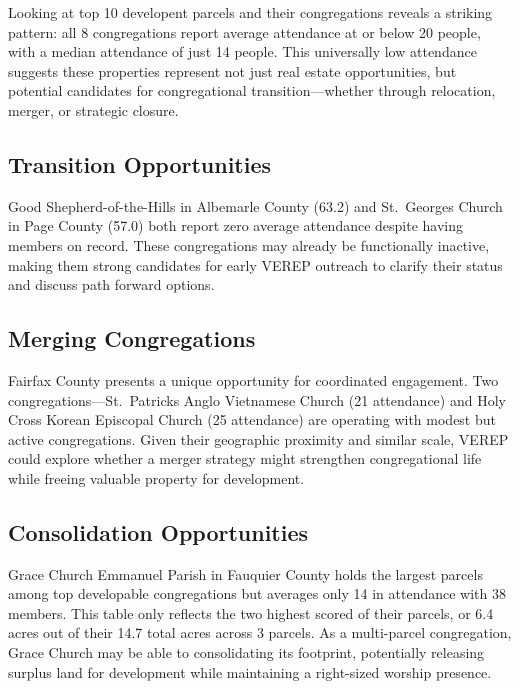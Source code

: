 \documentclass[
  letterpaper,
  DIV=11,
  numbers=noendperiod,
  oneside]{scrreprt}
\begin{document}
Looking at top 10 developent parcels and their congregations reveals a
striking pattern: all 8 congregations report average attendance at or
below 20 people, with a median attendance of just 14 people. This
universally low attendance suggests these properties represent not just
real estate opportunities, but potential candidates for congregational
transition---whether through relocation, merger, or strategic closure.

\subsection{Transition Opportunities}\label{transition-opportunities}

Good Shepherd-of-the-Hills in Albemarle County (63.2) and St.~Georges
Church in Page County (57.0) both report zero average attendance despite
having members on record. These congregations may already be
functionally inactive, making them strong candidates for early VEREP
outreach to clarify their status and discuss path forward options.

\subsection{Merging Congregations}\label{merging-congregations}

Fairfax County presents a unique opportunity for coordinated engagement.
Two congregations---St.~Patricks Anglo Vietnamese Church (21 attendance)
and Holy Cross Korean Episcopal Church (25 attendance) are operating
with modest but active congregations. Given their geographic proximity
and similar scale, VEREP could explore whether a merger strategy might
strengthen congregational life while freeing valuable property for
development.

\subsection{Consolidation
Opportunities}\label{consolidation-opportunities}

Grace Church Emmanuel Parish in Fauquier County holds the largest
parcels among top developable congregations but averages only 14 in
attendance with 38 members. This table only reflects the two highest
scored of their parcels, or 6.4 acres out of their 14.7 total acres
across 3 parcels. As a multi-parcel congregation, Grace Church may be
able to consolidating its footprint, potentially releasing surplus land
for development while maintaining a right-sized worship presence.
\end{document}
